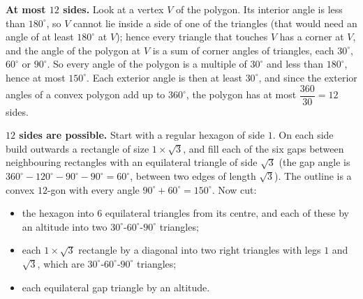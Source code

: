 \textbf{At most $12$ sides.} Look at a vertex $V$ of the polygon. Its interior angle is less than $180^\circ$, so $V$ cannot lie inside a side of one of the triangles (that would need an angle of at least $180^\circ$ at $V$); hence every triangle that touches $V$ has a corner at $V$, and the angle of the polygon at $V$ is a sum of corner angles of triangles, each $30^\circ$, $60^\circ$ or $90^\circ$. So every angle of the polygon is a multiple of $30^\circ$ and less than $180^\circ$, hence at most $150^\circ$. Each exterior angle is then at least $30^\circ$, and since the exterior angles of a convex polygon add up to $360^\circ$, the polygon has at most $\dfrac{360}{30}=12$ sides.

\textbf{$12$ sides are possible.} Start with a regular hexagon of side $1$. On each side build outwards a rectangle of size $1\times\sqrt3$, and fill each of the six gaps between neighbouring rectangles with an equilateral triangle of side $\sqrt3$ (the gap angle is $360^\circ-120^\circ-90^\circ-90^\circ=60^\circ$, between two edges of length $\sqrt3$). The outline is a convex $12$-gon with every angle $90^\circ+60^\circ=150^\circ$. Now cut:
\begin{itemize}
\item the hexagon into $6$ equilateral triangles from its centre, and each of these by an altitude into two $30^\circ$-$60^\circ$-$90^\circ$ triangles;
\item each $1\times\sqrt3$ rectangle by a diagonal into two right triangles with legs $1$ and $\sqrt3$, which are $30^\circ$-$60^\circ$-$90^\circ$ triangles;
\item each equilateral gap triangle by an altitude.
\end{itemize}

